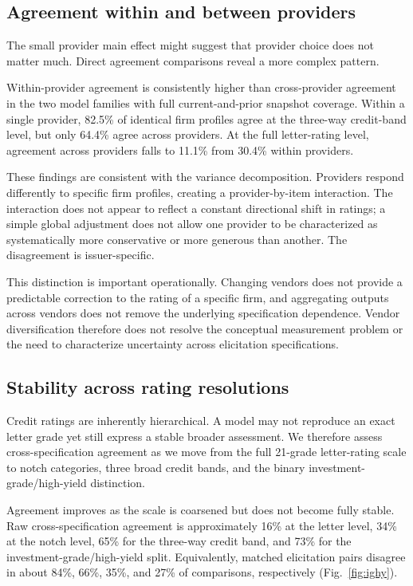 \documentclass[pdflatex,sn-nature,lineno]{sn-jnl}
\theoremstyle{thmstyleone}
\begin{document}
\subsection{Agreement within and between providers}
The small provider main effect might suggest that provider choice does not matter much. Direct agreement
comparisons reveal a more complex pattern.

Within-provider agreement is consistently higher than cross-provider agreement in the two model families with
full current-and-prior snapshot coverage. Within a single provider, 82.5\% of identical firm profiles
agree at the three-way credit-band level, but only 64.4\% agree across providers. At the full
letter-rating level, agreement across providers falls to 11.1\% from 30.4\% within providers.

These findings are consistent with the variance decomposition. Providers respond differently to specific
firm profiles, creating a provider-by-item interaction. The interaction does not appear to reflect a constant
directional shift in ratings; a simple global adjustment does not allow one provider to be
characterized as systematically more conservative or more generous than another. The disagreement is
issuer-specific.

This distinction is important operationally. Changing vendors does not provide a predictable correction
to the rating of a specific firm, and aggregating outputs across vendors does not remove the underlying
specification dependence. Vendor diversification therefore does not resolve the conceptual measurement
problem or the need to characterize uncertainty across elicitation specifications.

\subsection{Stability across rating resolutions}
Credit ratings are inherently hierarchical. A model may not reproduce an exact letter grade yet still
express a stable broader assessment. We therefore assess cross-specification agreement as we move from
the full 21-grade letter-rating scale to notch categories, three broad credit bands, and the binary
investment-grade/high-yield distinction.

Agreement improves as the scale is coarsened but does not become fully stable. Raw cross-specification
agreement is approximately 16\% at the letter level, 34\% at the notch level, 65\% for the three-way
credit band, and 73\% for the investment-grade/high-yield split. Equivalently, matched elicitation pairs
disagree in about 84\%, 66\%, 35\%, and 27\% of comparisons, respectively (Fig.~\ref{fig:ighy}).
\end{document}
